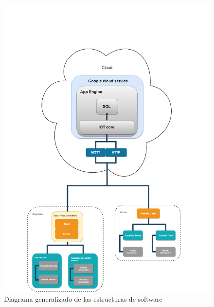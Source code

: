 \begin{figure}[htbp]
	\centering
	\includegraphics[width=14cm]{figuras/GeneralDiagram.png}
	\caption{Diagrama generalizado de las estructuras de software}	
	\label{diagramaGeneralizado}
\end{figure}
	
